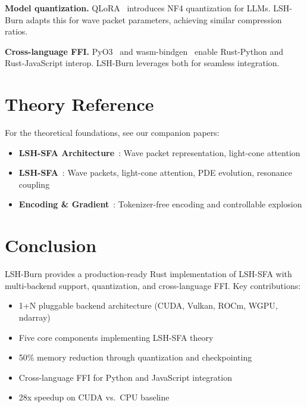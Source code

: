 \documentclass{article}
\begin{document}
\textbf{Model quantization.} QLoRA~\citep{dettmers2024qlora} introduces NF4 quantization for LLMs. LSH-Burn adapts this for wave packet parameters, achieving similar compression ratios.

\textbf{Cross-language FFI.} PyO3~\citep{pyo32024} and wasm-bindgen~\citep{wasmbindgen2024} enable Rust-Python and Rust-JavaScript interop. LSH-Burn leverages both for seamless integration.

\section{Theory Reference}

For the theoretical foundations, see our companion papers:

\begin{itemize}
\item \textbf{LSH-SFA Architecture}~\cite{lsh-sfa}: Wave packet representation, light-cone attention
\item \textbf{LSH-SFA}~\cite{lsh-sfa}: Wave packets, light-cone attention, PDE evolution, resonance coupling
\item \textbf{Encoding \& Gradient}~\cite{encoding-gradient}: Tokenizer-free encoding and controllable explosion
\end{itemize}

\section{Conclusion}

LSH-Burn provides a production-ready Rust implementation of LSH-SFA with multi-backend support, quantization, and cross-language FFI. Key contributions:

\begin{itemize}
\item 1+N pluggable backend architecture (CUDA, Vulkan, ROCm, WGPU, ndarray)
\item Five core components implementing LSH-SFA theory
\item 50\% memory reduction through quantization and checkpointing
\item Cross-language FFI for Python and JavaScript integration
\item 28x speedup on CUDA vs.\ CPU baseline
\end{itemize}
\end{document}
